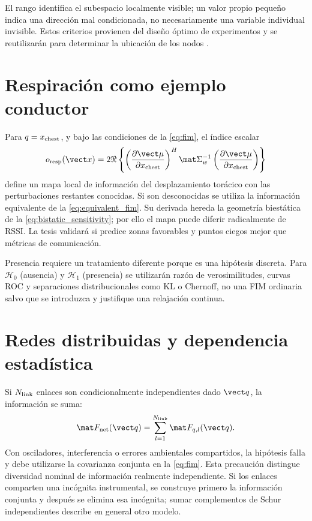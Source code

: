 El rango identifica el subespacio localmente visible; un valor propio pequeño indica una dirección mal condicionada, no necesariamente una variable individual invisible. Estos criterios provienen del diseño óptimo de experimentos y se reutilizarán para determinar la ubicación de los nodos \citep{Pukelsheim2006}.

\section{Respiración como ejemplo conductor}

Para $q=x_{\rm chest}$, y bajo las condiciones de la \cref{eq:fim}, el índice escalar
\begin{equation}
o_{\rm resp}(\vect x)=
2\Re\left\{
\left(\frac{\partial\vect\mu}{\partial x_{\rm chest}}\right)^H
\mat\Sigma_w^{-1}
\left(\frac{\partial\vect\mu}{\partial x_{\rm chest}}\right)
\right\}
\label{eq:resp_observability}
\end{equation}
define un mapa local de información del desplazamiento torácico con las
perturbaciones restantes conocidas. Si son desconocidas se utiliza la
información equivalente de la \cref{eq:equivalent_fim}. Su derivada hereda la geometría biestática de la \cref{eq:bistatic_sensitivity}; por ello el mapa puede diferir radicalmente de RSSI. La tesis validará si predice zonas favorables y puntos ciegos mejor que métricas de comunicación.

Presencia requiere un tratamiento diferente porque es una hipótesis discreta. Para $\mathcal H_0$ (ausencia) y $\mathcal H_1$ (presencia) se utilizarán razón de verosimilitudes, curvas ROC y separaciones distribucionales como KL o Chernoff, no una FIM ordinaria salvo que se introduzca y justifique una relajación continua.

\section{Redes distribuidas y dependencia estadística}

Si $N_{\rm link}$ enlaces son condicionalmente independientes dado $\vect q$, la información se suma:
\begin{equation}
\mat F_{\rm net}(\vect q)
=\sum_{l=1}^{N_{\rm link}}\mat F_{q,l}(\vect q).
\label{eq:fim_network}
\end{equation}
Con osciladores, interferencia o errores ambientales compartidos, la hipótesis falla y debe utilizarse la covarianza conjunta en la \cref{eq:fim}. Esta precaución distingue diversidad nominal de información realmente independiente.
Si los enlaces comparten una incógnita instrumental, se construye primero
la información conjunta y después se elimina esa incógnita; sumar
complementos de Schur independientes describe en general otro modelo.

